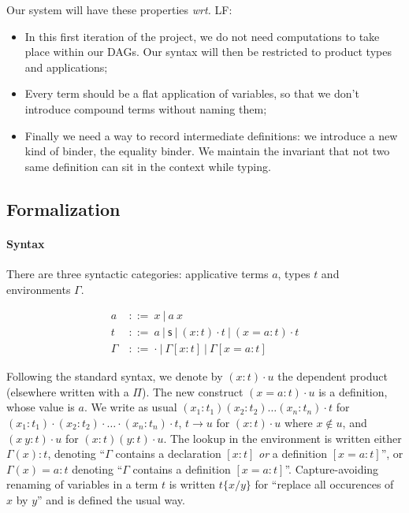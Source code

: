 \documentclass{article}
\newcommand{\sort}{\textsf{s}}
\newcommand{\gor}{\ |\ }
\newcommand{\gdecl}[2]{{#1}\ &::=\ {#2}}
\newcommand{\subst}[2]{\{#1/#2\}}
\newcommand{\remplan}[1]{}
\newcommand{\remtext}[1]{}
\begin{document}
Our system will have these properties \emph{wrt.} LF:
\begin{itemize}
\item In this first iteration of the project, we do not need
  computations to take place within our DAGs. Our syntax will then be
  restricted to product types and applications;
\item Every term should be a flat application of variables, so that we
  don't introduce compound terms without naming them;
\item Finally we need a way to record intermediate definitions: we
  introduce a new kind of binder, the equality binder. We maintain the
  invariant that not two same definition can sit in the context while
  typing.
\end{itemize}

\remtext{Fri Jun 18, 2010 10:26 AM. 
  Du coup, il faudrait reformuler un peu les paragraphes précédents.}

\subsection{Formalization}

\remplan{On rentre dans les détails techniques. Je crois qu'il faut
  prendre un peu de temps pour définir précisément les termes utilisés
  (repository, patch, etc) et expliquer/paraphraser les règles.}

\paragraph{Syntax} There are three syntactic categories: applicative
terms $a$, types $t$ and environments $\Gamma$.


\begin{align*}
 \gdecl{a}{x \gor a\ x } \\
 \gdecl{t}{a \gor \sort \gor (x:t)\cdot t \gor (x=a:t)\cdot t} \\
 \gdecl{\Gamma}{\cdot \gor \Gamma[x:t] \gor \Gamma[x=a:t]}
\end{align*}

Following the standard syntax, we denote by $(x:t)\cdot u$ the
dependent product (elsewhere written with a $\Pi$). The new construct
$(x=a:t)\cdot u$ is a definition, whose value is $a$. We write as
usual $(x_1:t_1)(x_2:t_2)\ldots(x_n:t_n)\cdot t$ for
$(x_1:t_1)\cdot(x_2:t_2)\cdot\ldots\cdot(x_n:t_n)\cdot t$, $t \to u$
for $(x:t)\cdot u$ where $x\notin u$, and $(x\ y : t)\cdot u$ for
$(x:t)(y:t)\cdot u$. The lookup in the environment is written either
$\Gamma(x):t$, denoting ``$\Gamma$ contains a declaration $[x:t]$
\emph{or} a definition $[x=a:t]$'', or $\Gamma(x)=a:t$ denoting
``$\Gamma$ contains a definition $[x=a:t]$''. Capture-avoiding
renaming of variables in a term $t$ is written $t\subst{x}{y}$ for
``replace all occurences of $x$ by $y$'' and is defined the usual way.
\end{document}
